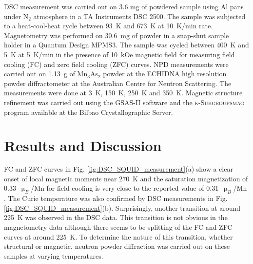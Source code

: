 \documentclass[10pt,doublespacing,edeposit]{uiucthesis2020}
\begin{document}
\begin{mainmatter}
DSC measurement was carried out on 3.6 mg of powdered sample using Al pans under N$_2$ atmosphere in a TA Instruments DSC 2500. The sample was subjected to a heat-cool-heat cycle between 93~K and 673~K at 10~K/min rate.
Magnetometry was performed on 30.6~mg of powder in a snap-shut sample holder in a Quantum Design MPMS3. The sample was cycled between 400~K and 5~K at 5~K/min in the presence of 10~kOe magnetic field for measuring field cooling (FC) and zero field cooling (ZFC) curves. NPD measurements were carried out on 1.13~g of Mn$_3$As$_2$ powder at the \textsc{ECHIDNA} high resolution powder diffractometer \cite{Avdeev2018} at the Australian Centre for Neutron Scattering. The measurements were done at 3~K, 150~K, 250~K and 350~K. Magnetic structure refinement was carried out using the \textsc{GSAS-II} software \cite{Toby:aj5212} and the \textsc{k-Subgroupsmag} program \cite{Perez-Mato2015} available at the Bilbao Crystallographic Server.



\section{Results and Discussion}


FC and ZFC curves in Fig. \ref{fig:DSC_SQUID_measurement}(a) show a clear onset of local magnetic moments near 270~K and the saturation magnetization of 0.33~$\upmu_B$/Mn for field cooling is very close to the reported value of 0.31~$\upmu_B$/Mn \cite{Yuzuri1960}. The Curie temperature was also confirmed by DSC measurements in Fig. \ref{fig:DSC_SQUID_measurement}(b). Surprisingly, another transition at around 225~K was observed in the DSC data. This transition is not obvious in the magnetometry data although there seems to be splitting of the FC and ZFC curves at around 225~K. To determine the nature of this transition, whether structural or magnetic, neutron powder diffraction was carried out on these samples at varying temperatures.


\end{mainmatter}
\end{document}
